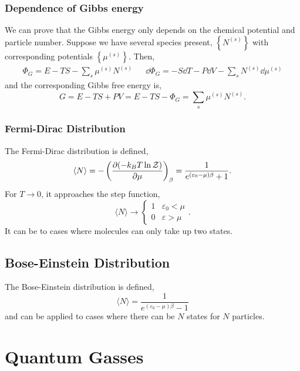 \documentclass{book}
\begin{document}
\subsection{Dependence of Gibbs energy}
We can prove that the Gibbs energy only depends on the chemical potential and particle number. Suppose we have several species present, $\left\{N^{(s)}\right\}$ with corresponding potentials $\left\{\mu^{(s)}\right\}$. Then,
\begin{align}
	\Phi_G = E - TS - \sum_s\mu^{(s)}N^{(s)} && \dd{\Phi_G} = - S\dd{T} - P\dd{V} - \sum_sN^{(s)}\dd{\mu}^{(s)}
\end{align}
and the corresponding Gibbs free energy is,
\begin{equation}
	G = E - TS + PV = E - TS - \Phi_G = \sum_s\mu^{(s)}N^{(s)}.
\end{equation}
\subsection{Fermi-Dirac Distribution}
The Fermi-Dirac distribution is defined,
\begin{equation}
	\langle N \rangle = -\left(\pdv{(-k_BT\ln\mathcal{Z})}{\mu}\right)_{\beta} = \frac{1}{e^{(\varepsilon_0 - \mu)\beta} + 1}.
\end{equation}
For $T \to 0$, it approaches the step function,
\begin{equation}
	\langle N \rangle \to \begin{cases}1 & \varepsilon_0 < \mu \\ 0 & \varepsilon > \mu\end{cases}.
\end{equation}
It can be to cases where molecules can only take up two states.
\section{Bose-Einstein Distribution}
The Bose-Einstein distribution is defined,
\begin{equation}
	\langle N \rangle = \frac{1}{e^{(\varepsilon_0 - \mu)\beta} - 1}
\end{equation}
and can be applied to cases where there can be $N$ states for $N$ particles.
\chapter{Quantum Gasses}
\end{document}
